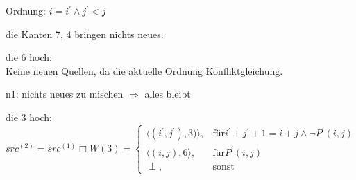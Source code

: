\begin{\itemize}
{\begin{\itemize}
        \end{\itemize}
        }
    \item {Ordnung: \(i=i^\prime \land j^\prime < j\) \\
      \begin{\itemize}
         \item die Kanten 7, 4 bringen nichts neues.
         \item die 6 hoch: \\
           Keine neuen Quellen, da die aktuelle Ordnung \blitza Konfliktgleichung.
         \item n1: nichts neues zu mischen \(\Rightarrow\) alles bleibt
         \item die 3 hoch: \\
           \(src^{(2)} = src^{(1)} \Box W(3) = 
           \begin{cases} \langle ( i^\prime, j^\prime), 3) \rangle, & \mbox{für} i^\prime + j^\prime + 1 = i + j \land \neg P^\prime(i,j)\\
             \langle (i,j),6 \rangle , & \mbox{für} P^\prime(i,j) \\
             \perp, & \mbox{sonst}
           \end{cases} \)
      \end{\itemize}
      }
    
\end{\itemize}



